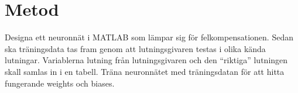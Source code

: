 \section{Metod}

Designa ett neuronnät i MATLAB som lämpar sig för felkompensationen.
Sedan ska träningsdata tas fram genom att lutningsgivaren testas i olika kända lutningar.
Variablerna lutning från lutningsgivaren och den ``riktiga'' lutningen skall samlas in i en tabell.
Träna neuronnätet med träningsdatan för att hitta fungerande weights och biases.

